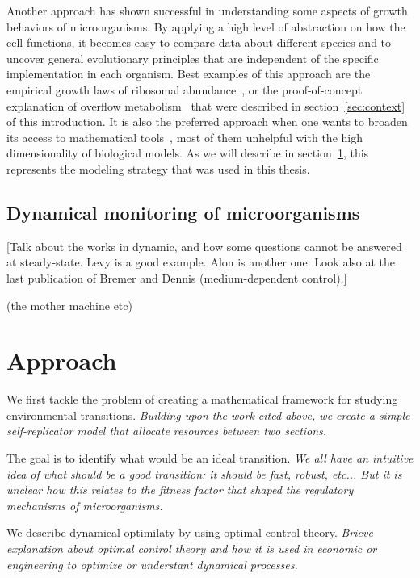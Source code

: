 Another approach has shown successful in understanding some aspects of growth behaviors of microorganisms.
By applying a high level of abstraction on how the cell functions, it becomes easy to compare data about different species and to uncover general evolutionary principles that are independent of the specific implementation in each organism.
Best examples of this approach are the empirical growth laws of ribosomal abundance~\cite{scott_bacterial_2011,scott_interdependence_2010,scott_emergence_2014}, or the proof-of-concept explanation of overflow metabolism~\cite{molenaar_shifts_2009} that were described in section~\ref{sec:context} of this introduction.
It is also the preferred approach when one wants to broaden its access to mathematical tools~\cite{vandenberg_optimal_1998}, most of them unhelpful with the high dimensionality of biological models.
As we will describe in section~\ref{sec:approach}, this represents the modeling strategy that was used in this thesis.

\subsection{Dynamical monitoring of microorganisms}

[Talk about the works in dynamic, and how some questions cannot be answered at steady-state.
Levy is a good example. Alon is another one. Look also at the last publication of Bremer and Dennis (medium-dependent control).]

(the mother machine etc)

\section{Approach}
\label{sec:approach}

We first tackle the problem of creating a mathematical framework for studying environmental transitions.
\textit{Building upon the work cited above, we create a simple self-replicator model that allocate resources between two sections.}

The goal is to identify what would be an ideal transition.
\textit{We all have an intuitive idea of what should be a good transition: it should be fast, robust, etc... But it is unclear how this relates to the fitness factor that shaped the regulatory mechanisms of microorganisms.}

We describe dynamical optimilaty by using optimal control theory.
\textit{Brieve explanation about optimal control theory and how it is used in economic or engineering to optimize or understant dynamical processes.}

